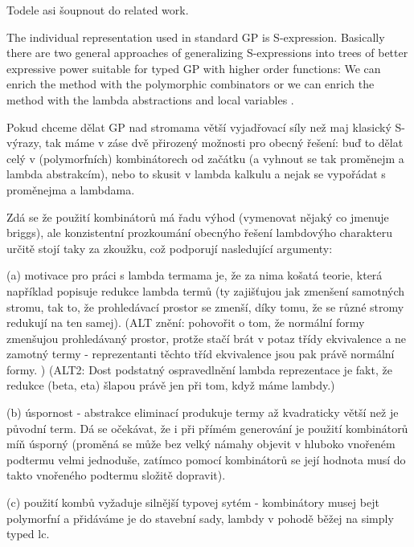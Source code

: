 \documentclass{sig-alternate}
\newcommand{\red}[1]{{\color{red} #1}}
\begin{document}
\red{ 

Todele asi šoupnout do related work.


The individual representation used in standard GP is S-expression. 
Basically there are two general approaches of generalizing S-expressions
into trees of better expressive power suitable for typed GP with higher 
order functions: We can enrich the method with the polymorphic combinators \cite{kes}
or we can enrich the method with the lambda abstractions and local variables
\cite{yu01}.  

Pokud chceme dělat GP nad stromama větší vyjadřovací síly než maj klasický S-výrazy, tak máme v záse dvě přirozený možnosti pro obecný řešení: buď to dělat celý v (polymorfních) kombinátorech od začátku (a vyhnout se tak proměnejm a lambda abstrakcím), nebo to skusit v lambda kalkulu a nejak se vypořádat s proměnejma a lambdama. 

Zdá se že použití kombinátorů má řadu výhod (vymenovat nějaký co jmenuje briggs), 
ale konzistentní prozkoumání obecnýho řešení lambdovýho charakteru určitě stojí 
taky za zkoužku, což podporují nasledující argumenty:

  (a) motivace pro práci s lambda termama je, že za nima košatá teorie, 
      která například popisuje redukce lambda termů (ty zajišťujou jak 
      zmenšení samotných stromu, tak to, že prohledávací prostor se zmenší, 
      díky tomu, že se různé stromy redukují na ten samej).
      (ALT znění: 
      pohovořit o tom, že normální formy zmenšujou prohledávaný prostor, 
      protže stačí brát v potaz třídy ekvivalence a ne zamotný termy 
      - reprezentanti těchto tříd ekvivalence jsou pak právě normální formy. )
      (ALT2: 
      Dost podstatný ospravedlnění lambda reprezentace je fakt, 
      že redukce (beta, eta) šlapou právě jen při tom, když máme lambdy.)

  (b) úspornost - abstrakce eliminací produkuje 
      termy až kvadraticky větší než je původní 
      term. Dá se očekávat, že i při přímém generování je použití kombinátorů 
      míň úsporný (proměná se může bez velký námahy objevit v hluboko vnořeném
      podtermu velmi jednoduše, zatímco pomocí kombinátorů se její hodnota musí do
      takto vnořeného podtermu složitě dopravit). 

  (c) použití kombů vyžaduje silnější typovej sytém - 
      kombinátory musej bejt polymorfní a přidáváme je do stavební sady,
      lambdy v pohodě běžej na simply typed lc. 

}
\end{document}
